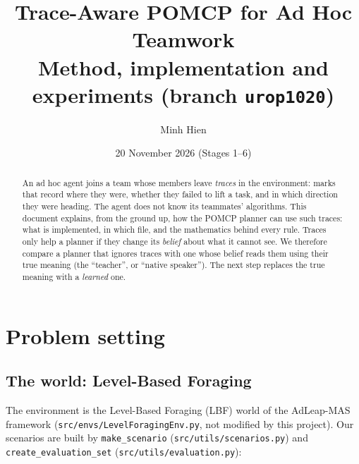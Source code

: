 \documentclass[11pt,a4paper]{article}
\title{Trace-Aware POMCP for Ad Hoc Teamwork\\[2pt]
\large Method, implementation and experiments (branch \texttt{urop1020})}
\author{Minh Hien}
\date{20 November 2026 (Stages 1--6)}
\newcommand{\file}{\nolinkurl}  %
\newcommand{\code}[1]{\texttt{#1}}
\theoremstyle{remark}
\begin{document}
\maketitle

\begin{abstract}
An ad hoc agent joins a team whose members leave \emph{traces} in the environment: marks that record where they were,
whether they failed to lift a task, and in which direction they were heading. The agent does not know its teammates'
algorithms. This document explains, from the ground up, how the POMCP planner can use such traces: what is implemented,
in which file, and the mathematics behind every rule. Traces only help a planner if they change its \emph{belief} about
what it cannot see. We therefore compare a planner that ignores traces with one whose belief reads them using their true
meaning (the ``teacher'', or ``native speaker''). The next step replaces the true meaning with a \emph{learned} one.
\end{abstract}

\tableofcontents

\section{Problem setting}
\label{sec:setting}

\subsection{The world: Level-Based Foraging}

The environment is the Level-Based Foraging (LBF) world of the AdLeap-MAS framework (\file{src/envs/LevelForagingEnv.py},
not modified by this project). Our scenarios are built by \code{make\_scenario} (\file{src/utils/scenarios.py}) and
\code{create\_evaluation\_set} (\file{src/utils/evaluation.py}):
\end{document}
